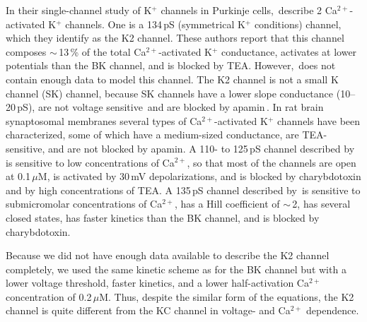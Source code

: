 \documentclass[12pt]{article}
\begin{document}
In their single-channel study of K$^+$ channels in Purkinje cells,\,\cite{Gruol:1991dz} describe 2 Ca$^{2+}$-activated K$^+$ channels. One is a 134\,pS (symmetrical K$^+$ conditions) channel, which they identify as the K2 channel. These authors report that this channel composes $\sim$\,13\,\% of the total Ca$^{2+}$-activated K$^+$ conductance, activates at lower potentials than the BK channel, and is blocked by TEA. However,\,\cite{Gruol:1991dz} does not contain enough data to model this channel. The K2 channel is not a small K channel (SK) channel, because SK channels have a lower slope conductance (10--20\,pS), are not voltage sensitive\,\cite{Lancaster:1991ye, Lang:1987qo} and are blocked by apamin\,\cite{Latorre:1989fu}. In rat brain synaptosomal membranes several types of Ca$^{2+}$-activated K$^+$ channels have been characterized, some of which have a medium-sized conductance, are TEA-sensitive, and are not blocked by apamin. A 110- to 125\,pS channel described by\,\cite{Farley:1988tw} is sensitive to low concentrations of Ca$^{2+}$, so that most of the channels are open at 0.1\,$\mu$M, is activated by 30\,mV depolarizations, and is blocked by charybdotoxin and by high concentrations of TEA. A 135\,pS channel described by\,\cite{Reinhart1989:xe} is sensitive to submicromolar concentrations of Ca$^{2+}$, has a Hill coefficient of $\sim$\,2, has several closed states, has faster kinetics than the BK channel, and is blocked by charybdotoxin.

Because we did not have enough data available to describe the K2 channel completely, we used the same kinetic scheme as for the BK channel but with a lower voltage threshold, faster kinetics, and a lower half-activation Ca$^{2+}$ concentration of 0.2\,$\mu$M. Thus, despite the similar form of the equations, the K2 channel is quite different from the KC channel in voltage- and Ca$^{2+}$ dependence.



\end{document}

